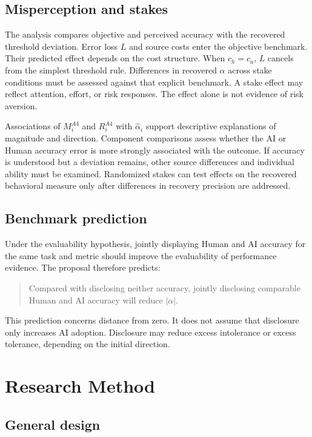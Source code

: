 \documentclass[11pt,a4paper]{article}
\begin{document}
\subsection{Misperception and stakes}

The analysis compares objective and perceived accuracy with the recovered threshold deviation. Error loss $L$ and source costs enter the objective benchmark. Their predicted effect depends on the cost structure. When $c_h=c_a$, $L$ cancels from the simplest threshold rule. Differences in recovered $\alpha$ across stake conditions must be assessed against that explicit benchmark. A stake effect may reflect attention, effort, or risk responses. The effect alone is not evidence of risk aversion.

Associations of $M_i^{A4}$ and $R_i^{A4}$ with $\widehat\alpha_i$ support descriptive explanations of magnitude and direction. Component comparisons assess whether the AI or Human accuracy error is more strongly associated with the outcome. If accuracy is understood but a deviation remains, other source differences and individual ability must be examined. Randomized stakes can test effects on the recovered behavioral measure only after differences in recovery precision are addressed.

\subsection{Benchmark prediction}

Under the evaluability hypothesis, jointly displaying Human and AI accuracy for the same task and metric should improve the evaluability of performance evidence. The proposal therefore predicts:

\begin{quote}
Compared with disclosing neither accuracy, jointly disclosing comparable Human and AI accuracy will reduce $|\alpha|$.
\end{quote}

This prediction concerns distance from zero. It does not assume that disclosure only increases AI adoption. Disclosure may reduce excess intolerance or excess tolerance, depending on the initial direction.

\section{Research Method}

\subsection{General design}
\end{document}
